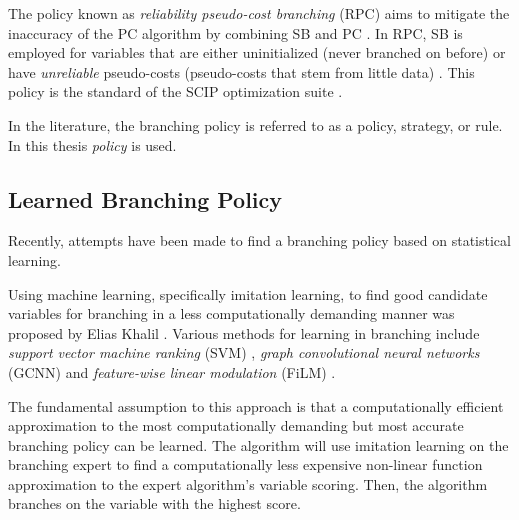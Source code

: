 The policy known as \textit{reliability pseudo-cost branching} (\gls{RPC}) aims to mitigate the inaccuracy of the \gls{PC} algorithm by combining \gls{SB} and \gls{PC} \cite{anand2017comparative}. In \gls{RPC}, \gls{SB} is employed for variables that are either uninitialized (never branched on before) or have \textit{unreliable} pseudo-costs (pseudo-costs that stem from little data) \cite{achterberg2004branching}. This policy is the standard of the \gls{SCIP} optimization suite \cite{achterberg2009scip}. 

In the literature, the branching policy is referred to as a policy, strategy, or rule. In this thesis \textit{policy} is used.  








\subsection{Learned Branching Policy}

Recently, attempts have been made to find a branching policy based on statistical learning. 

Using machine learning, specifically imitation learning, to find good candidate variables for branching in a less computationally demanding manner was proposed by Elias Khalil \cite{khalil2016learning}. Various methods for learning in branching include \textit{ support vector machine ranking} (\Gls{SVM}) \cite{khalil2016learning}, \textit{graph convolutional neural networks} (\gls{GCNN}) \cite{gasse2019exact} and \textit{feature-wise linear modulation} (\gls{FiLM}) \cite{gupta2020hybrid}.

The fundamental assumption to this approach is that a computationally efficient approximation to the most computationally demanding but most accurate branching policy can be learned. The algorithm will use imitation learning on the branching expert to find a computationally less expensive non-linear function approximation to the expert algorithm's variable scoring. Then, the algorithm branches on the variable with the highest score. 




